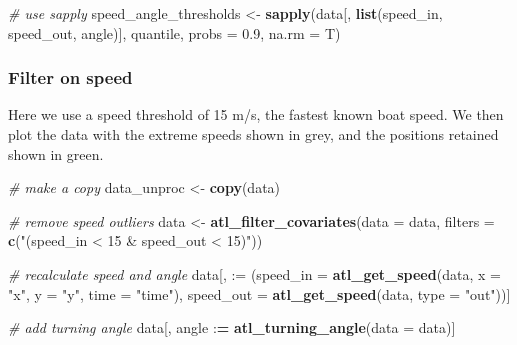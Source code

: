 \documentclass[
]{scrartcl}
\newenvironment{Shaded}{}{}
\newcommand{\CommentTok}[1]{\textcolor[rgb]{0.38,0.63,0.69}{\textit{#1}}}
\newcommand{\DataTypeTok}[1]{\textcolor[rgb]{0.56,0.13,0.00}{#1}}
\newcommand{\ErrorTok}[1]{\textcolor[rgb]{1.00,0.00,0.00}{\textbf{#1}}}
\newcommand{\FloatTok}[1]{\textcolor[rgb]{0.25,0.63,0.44}{#1}}
\newcommand{\KeywordTok}[1]{\textcolor[rgb]{0.00,0.44,0.13}{\textbf{#1}}}
\newcommand{\NormalTok}[1]{#1}
\newcommand{\OperatorTok}[1]{\textcolor[rgb]{0.40,0.40,0.40}{#1}}
\newcommand{\StringTok}[1]{\textcolor[rgb]{0.25,0.44,0.63}{#1}}
\begin{document}
\begin{Shaded}
\begin{Highlighting}[]
\CommentTok{\# use sapply}
\NormalTok{speed\_angle\_thresholds <{-}}\StringTok{ }
\StringTok{  }\KeywordTok{sapply}\NormalTok{(data[, }\KeywordTok{list}\NormalTok{(speed\_in, speed\_out, angle)], }
\NormalTok{       quantile, }\DataTypeTok{probs =} \FloatTok{0.9}\NormalTok{, }\DataTypeTok{na.rm =}\NormalTok{ T)}
\end{Highlighting}
\end{Shaded}

\hypertarget{filter-on-speed}{%
\subsubsection{Filter on speed}\label{filter-on-speed}}

Here we use a speed threshold of 15 m/s, the fastest known boat speed.
We then plot the data with the extreme speeds shown in grey, and the positions retained shown in green.

\begin{Shaded}
\begin{Highlighting}[]
\CommentTok{\# make a copy}
\NormalTok{data\_unproc <{-}}\StringTok{ }\KeywordTok{copy}\NormalTok{(data)}

\CommentTok{\# remove speed outliers}
\NormalTok{data <{-}}\StringTok{ }\KeywordTok{atl\_filter\_covariates}\NormalTok{(}\DataTypeTok{data =}\NormalTok{ data,}
            \DataTypeTok{filters =} \KeywordTok{c}\NormalTok{(}\StringTok{"(speed\_in < 15 \& speed\_out < 15)"}\NormalTok{))}

\CommentTok{\# recalculate speed and angle}
\NormalTok{data[, }\StringTok{\textasciigrave{}}\DataTypeTok{:=}\StringTok{\textasciigrave{}}\NormalTok{ (}\DataTypeTok{speed\_in =} \KeywordTok{atl\_get\_speed}\NormalTok{(data, }
                                      \DataTypeTok{x =} \StringTok{"x"}\NormalTok{, }
                                      \DataTypeTok{y =} \StringTok{"y"}\NormalTok{, }
                                      \DataTypeTok{time =} \StringTok{"time"}\NormalTok{),}
             \DataTypeTok{speed\_out =} \KeywordTok{atl\_get\_speed}\NormalTok{(data, }\DataTypeTok{type =} \StringTok{"out"}\NormalTok{))]}

\CommentTok{\# add turning angle}
\NormalTok{data[, angle }\OperatorTok{:}\ErrorTok{=}\StringTok{ }\KeywordTok{atl\_turning\_angle}\NormalTok{(}\DataTypeTok{data =}\NormalTok{ data)]}
\end{Highlighting}
\end{Shaded}
\end{document}
